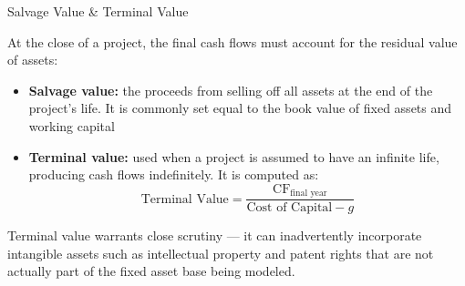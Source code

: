 \documentclass[10pt]{article}
\begin{document}
    \begin{core}{Salvage Value \& Terminal Value}

      At the close of a project, the final cash flows must account for the residual value of assets:

      \begin{itemize}

        \item \textbf{Salvage value:} the proceeds from selling off all assets at the end of the project's life. It is commonly set equal to the book value of fixed assets and working capital

        \item \textbf{Terminal value:} used when a project is assumed to have an infinite life, producing cash flows indefinitely. It is computed as:
        \[
          \text{Terminal Value} = \frac{\text{CF}_{\text{final year}}}{\text{Cost of Capital} - g}
        \]

      \end{itemize}

      Terminal value warrants close scrutiny — it can inadvertently incorporate intangible assets such as intellectual property and patent rights that are not actually part of the fixed asset base being modeled.


    \end{core}
\end{document}
